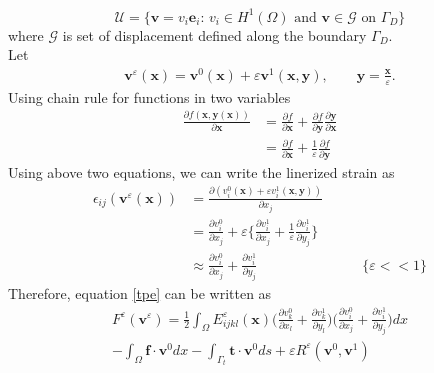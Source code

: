 \documentclass[10pt]{article}
\newcommand{\e}[1]{\textbf{#1}}
\begin{document}
\begin{equation}
\mathcal{U} = \{\textbf{v} = v_i\textbf{e}_i :\, v_i\in H^1(\Omega) \text{ and } \textbf{v}\in\mathcal{G} \text{ on } \Gamma_D\}
\end{equation}
where $\mathcal{G}$ is set of displacement defined along the boundary $\Gamma_D$.\\
Let 
\begin{align}
\textbf{v}^\varepsilon(\textbf{x}) = \textbf{v}^0(\textbf{x})+\varepsilon\textbf{v}^1(\textbf{x},\textbf{y}),\qquad \textbf{y}=\frac{\textbf{x}}{\varepsilon}.
\end{align}
Using chain rule for functions in two variables\\
\begin{equation}
\begin{split}
\frac{\partial f(\e x, \e y(\e x))}{\partial \textbf{x}} &= \frac{\partial f}{\partial \textbf{x}}+\frac{\partial f}{\partial \textbf{y}}\frac{\partial \textbf{y}}{\partial \textbf{x}}\\
&=\frac{\partial f}{\partial \textbf{x}}+\frac{1}{\varepsilon}\frac{\partial f}{\partial \textbf{y}}
\end{split}
\end{equation}
Using above two equations, we can write the linerized strain as
\begin{equation}
\begin{split}
\epsilon_{ij}(\textbf{v}^\varepsilon(\textbf{x})) &= \frac{\partial (v_{i}^0(\textbf{x})+\varepsilon v_{i}^1(\textbf{x},\textbf{y}))}{\partial x_j}\\
&=\frac{\partial v_i^0}{\partial x_j}+\varepsilon\bigg\{\frac{\partial v_{i}^1}{\partial x_j}+\frac{1}{\varepsilon}\frac{\partial v_{i}^1}{\partial y_j}\bigg\}\\
&\approx \frac{\partial v_{i}^0}{\partial x_j}+\frac{\partial v_{i}^1}{\partial y_j} &\qquad \{ \varepsilon << 1\}
\end{split}
\end{equation}
Therefore, equation \eqref{tpe} can be written as 
\begin{multline}
F^\varepsilon(\textbf{v}^\varepsilon) = \frac{1}{2}\int_\Omega E^\varepsilon_{ijkl}(\e x)\bigg (\frac{\partial v_{k}^0}{\partial x_l}+\frac{\partial v_{k}^1}{\partial y_l}\bigg )\bigg (\frac{\partial v_{i}^0}{\partial x_j}+\frac{\partial v_{i}^1}{\partial y_j}\bigg )dx\\
-\int_\Omega\textbf{f}\cdot\textbf{v}^0 dx - \int_{\Gamma_t}\textbf{t}\cdot\textbf{v}^0 ds + \varepsilon R^\varepsilon(\textbf{v}^0, \textbf{v}^1)
\end{multline}
\end{document}
